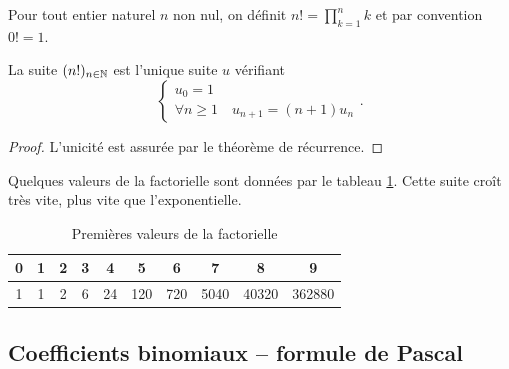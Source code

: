 \begin{defdef}
  Pour tout entier naturel \(n\) non nul, on définit \(n!=\prod_{k=1}^n k\) et par convention \(0!=1\).
\end{defdef}
\begin{prop}
  La suite \((n!)_{n\in\mathbb{N}}\) est l'unique suite \(u\) vérifiant
  \begin{equation}
    \begin{cases}
      u_0=1 \\
      \forall n\geqslant 1 \quad u_{n+1}=(n+1) u_n
    \end{cases}.
  \end{equation}
\end{prop}
\begin{proof}
  L'unicité est assurée par le théorème de récurrence. 
\end{proof}
Quelques valeurs de la factorielle sont données par le tableau
\ref{tab:factorielle}. Cette suite croît très vite, plus vite que l'exponentielle.
\begin{table}[h]
    \centering
    \begin{tabular}{|c|c|c|c|c|c|c|c|c|c|}
        \hline
        0 & 1 & 2 & 3 & 4  & 5   & 6   & 7    & 8     & 9 \\ \hline
        1 & 1 & 2 & 6 & 24 & 120 & 720 & 5040 & 40320 & 362880 \\ \hline
    \end{tabular}
    \caption{Premières valeurs de la factorielle}
    \label{tab:factorielle}
\end{table}

\subsection{Coefficients binomiaux -- formule de Pascal}

